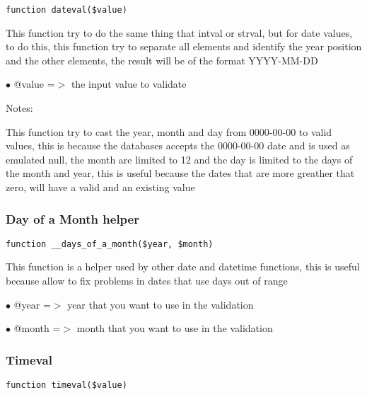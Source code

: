 \documentclass[a4paper]{article}
\begin{document}
\begin{lstlisting}
function dateval($value)
\end{lstlisting}

This function try to do the same thing that intval or strval, but for date
values, to do this, this function try to separate all elements and identify
the year position and the other elements, the result will be of the format
YYYY-MM-DD

\begin{compactitem}
\item[\color{myblue}$\bullet$] @value =$>$ the input value to validate
\end{compactitem}

Notes:

This function try to cast the year, month and day from 0000-00-00 to valid
values, this is because the databases accepts the 0000-00-00 date and is used
as emulated null, the month are limited to 12 and the day is limited to the
days of the month and year, this is useful because the dates that are more
greather that zero, will have a valid and an existing value

\hypertarget{toc103}{}
\subsubsection{Day of a Month helper}

\begin{lstlisting}
function __days_of_a_month($year, $month)
\end{lstlisting}

This function is a helper used by other date and datetime functions, this
is useful because allow to fix problems in dates that use days out of range

\begin{compactitem}
\item[\color{myblue}$\bullet$] @year  =$>$ year that you want to use in the validation
\item[\color{myblue}$\bullet$] @month =$>$ month that you want to use in the validation
\end{compactitem}

\hypertarget{toc104}{}
\subsubsection{Timeval}

\begin{lstlisting}
function timeval($value)
\end{lstlisting}
\end{document}
